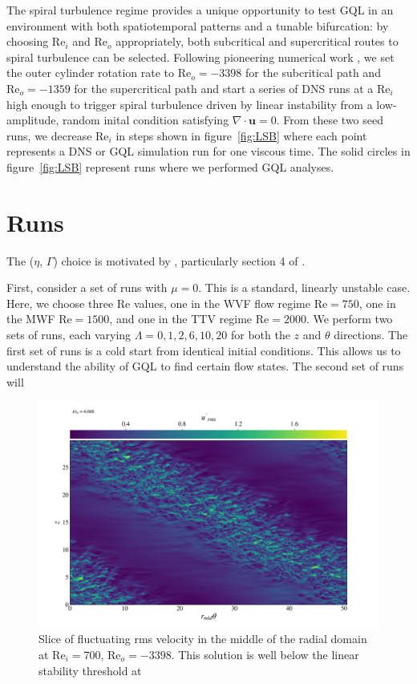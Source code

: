 \documentclass[openacc]{rstransa}%
\newcommand{\Reyn}{\mathrm{Re}}
\begin{document}
The spiral turbulence regime provides a unique opportunity to test GQL in an environment with both spatiotemporal patterns and a tunable bifurcation: by choosing $\Reyn_i$ and $\Reyn_o$ appropriately, both subcritical and supercritical routes to spiral turbulence can be selected.
Following pioneering numerical work \cite{2009PhRvE..79c6309M, 2009PhRvE..80d6315M}, we set the outer cylinder rotation rate to $\Reyn_o = -3398$ for the subcritical path and $\Reyn_o = -1359$ for the supercritical path and start a series of DNS runs at a $\Reyn_i$ high enough to trigger spiral turbulence driven by linear instability from a low-amplitude, random inital condition satisfying $\nabla \cdot \mathbf{u} = 0$.
From these two seed runs, we decrease $\Reyn_i$ in steps shown in figure~\ref{fig:LSB} where each point represents a DNS or GQL simulation run for one viscous time. The solid circles in figure~\ref{fig:LSB} represent runs where we performed GQL analyses. 

\section{Runs}
\label{sec:nonlinear}


The ($\eta$, $\Gamma$) choice is motivated by \cite{1984JFM...146...45M,1984JFM...146...65M}, particularly section 4 of \cite{1984JFM...146...65M}.

First, consider a set of runs with $\mu = 0$. This is a standard, linearly unstable case. Here, we choose three $\Reyn$ values, one in the WVF flow regime $\Reyn =750$, one in the MWF $\Reyn = 1500$, and one in the TTV regime $\Reyn = 2000$. We perform two sets of runs, each varying $\Lambda = {0, 1, 2, 6, 10, 20}$ for both the $z$ and $\theta$ directions. The first set of runs is a cold start from identical initial conditions. This allows us to understand the ability of GQL to find certain flow states. The second set of runs will 

\begin{figure}
    \centering
    \includegraphics[width=\textwidth]{../figs/urms_tz_rei_700_reo-3398_000278.png}
    \caption{Slice of fluctuating rms velocity in the middle of the radial domain at $\Reyn_i = 700$, $\Reyn_o = -3398$. This solution is well below the linear stability threshold at }
    \label{fig:urms_tz_rei700}
\end{figure}
\end{document}
